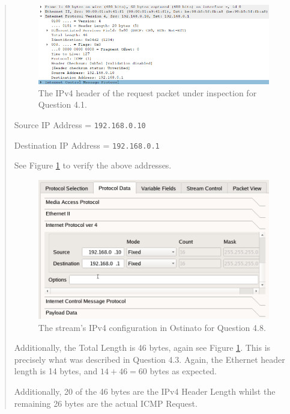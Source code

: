 \documentclass{article}
\newenvironment{ans}
   {\fbox{Answer}\begin{quote}\nopagebreak}
   {\end{quote}}
\begin{document}
\begin{ans}
	\begin{figure}[H]
		\centering
		\includegraphics[width=14cm]{data/q4.8-ip-header.png}
		\caption{The IPv4 header of the request packet under
			inspection for Question 4.1.}
		\label{fig:ip-header-for-q4.8}
	\end{figure}
	
	Source IP Address = \texttt{192.168.0.10}
	
	Destination IP Address = \texttt{192.168.0.1}
	
	See Figure \ref{fig:ip-header-for-q4.8} to verify the above addresses.
	
	\begin{figure}[H]
		\centering
		\includegraphics[width=14cm]{data/q4.8-stream-config.png}
		\caption{The stream's IPv4 configuration in Ostinato for Question 4.8.}
		\label{fig:stream-config-for-q4.8}
	\end{figure}
	
	Additionally, the Total Length is 46 bytes, again see Figure \ref{fig:ip-header-for-q4.8}. This is precisely
	what was described in Question 4.3. Again, the Ethernet header length is
	14 bytes, and $14 + 46 = 60$ bytes as expected.
	
	Additionally, 20 of the 46 bytes are the IPv4 Header Length whilst the remaining 26 bytes are the actual ICMP Request.
\end{ans}
\end{document}
